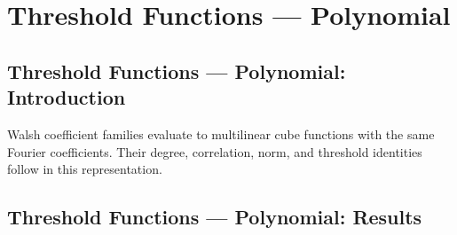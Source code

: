 \section{Threshold Functions --- Polynomial}
\subsection*{Threshold Functions --- Polynomial: Introduction}
Walsh coefficient families evaluate to multilinear cube functions with the same Fourier coefficients. Their degree, correlation, norm, and threshold identities follow in this representation.

\subsection*{Threshold Functions --- Polynomial: Results}

